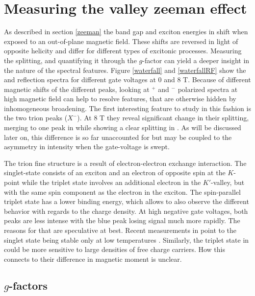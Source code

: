 \section{Measuring the valley zeeman effect}\label{zeemanspec}

As described in section \ref{zeeman} the band gap and exciton energies in \tmds shift when exposed to an out-of-plane magnetic field. These shifts are reversed in light of opposite helicity and differ for different types of excitonic processes. Measuring the splitting, and quantifying it through the $g$-factor can yield a deeper insight in the nature of the spectral features. Figure \ref{waterfall} and \ref{waterfallRF} show the \pl and reflection spectra for different gate voltages at 0 and 8 T. Because of different magnetic shifts of the different peaks, looking at \sigma$^+$ and \sigma$^-$ polarized spectra at high magnetic field can help to resolve features, that are otherwise hidden by inhomogeneous broadening. The first interesting feature to study in this fashion is the two trion peaks ($X^-$). At 8 T they reveal significant change in their splitting, merging to one peak in \sigp while showing a clear splitting in \sigm. As will be discussed later on, this difference is so far unaccounted for but may be coupled to the asymmetry in intensity when the gate-voltage is swept.

The trion fine structure is a result of electron-electron exchange interaction. The singlet-state consists of an exciton and an electron of opposite spin at the $K$-point while the triplet state involves an additional electron in the $K'$-valley, but with the same spin component as the electron in the exciton. The spin-parallel triplet state has a lower binding energy, which allows to also observe the different behavior with regards to the charge density. At high negative gate voltages, both peaks are less intense with the blue peak losing signal much more rapidly. The reasons for that are speculative at best. Recent measurements in \ws point to the singlet state being stable only at low temperatures \cite{vaclavkova_singlet_2018}. Similarly, the triplet state in \wse could be more sensitive to large densities of free charge carriers. How this connects to their difference in magnetic moment is unclear.

\subsection{\textup{$g$}-factors}


